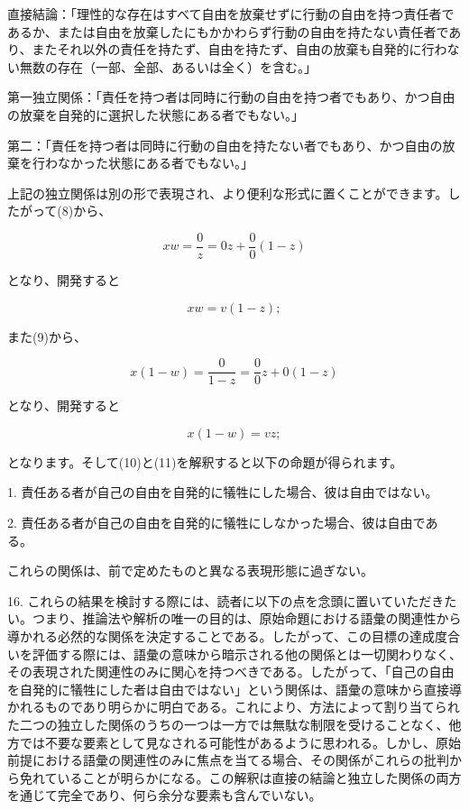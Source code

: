 \documentclass[a4paper,11pt,openany]{ltjsbook}
\begin{document}
\textsc{直接結論}：「理性的な存在はすべて自由を放棄せずに行動の自由を持つ責任者であるか、または自由を放棄したにもかかわらず行動の自由を持たない責任者であり、またそれ以外の責任を持たず、自由を持たず、自由の放棄も自発的に行わない無数の存在（一部、全部、あるいは全く）を含む。」

\textsc{第一独立関係}：「責任を持つ者は同時に行動の自由を持つ者でもあり、かつ自由の放棄を自発的に選択した状態にある者でもない。」

\textsc{第二}：「責任を持つ者は同時に行動の自由を持たない者でもあり、かつ自由の放棄を行わなかった状態にある者でもない。」

上記の独立関係は別の形で表現され、より便利な形式に置くことができます。したがって(8)から、

\[
xw = \frac{0}{z} = 0z + \frac{0}{0}(1-z)
\]

となり、開発すると

\begin{equation}
xw = v(1-z);
\end{equation}

また(9)から、

\[
x(1-w) = \frac{0}{1-z} = \frac{0}{0}z + 0(1-z)
\]

となり、開発すると

\begin{equation}
x (1 - w) = vz;
\end{equation}

となります。そして(10)と(11)を解釈すると以下の命題が得られます。

1. 責任ある者が自己の自由を自発的に犠牲にした場合、彼は自由ではない。

2. 責任ある者が自己の自由を自発的に犠牲にしなかった場合、彼は自由である。

これらの関係は、前で定めたものと異なる表現形態に過ぎない。

16. これらの結果を検討する際には、読者に以下の点を念頭に置いていただきたい。つまり、推論法や解析の唯一の目的は、原始命題における語彙の関連性から導かれる必然的な関係を決定することである。したがって、この目標の達成度合いを評価する際には、語彙の意味から暗示される他の関係とは一切関わりなく、その表現された関連性のみに関心を持つべきである。したがって、「自己の自由を自発的に犠牲にした者は自由ではない」という関係は、語彙の意味から直接導かれるものであり明らかに明白である。これにより、方法によって割り当てられた二つの独立した関係のうちの一つは一方では無駄な制限を受けることなく、他方では不要な要素として見なされる可能性があるように思われる。しかし、原始前提における語彙の関連性のみに焦点を当てる場合、その関係がこれらの批判から免れていることが明らかになる。この解釈は直接の結論と独立した関係の両方を通じて完全であり、何ら余分な要素も含んでいない。
\end{document}
